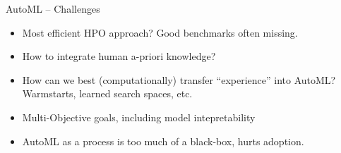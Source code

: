 \begin{frame}{AutoML -- Challenges}
\begin{itemize}
    \item Most efficient HPO approach? Good benchmarks often missing.
    \item How to integrate human a-priori knowledge?
    \item How can we best (computationally) transfer ``experience'' into AutoML?
    Warmstarts, learned search spaces, etc. 
    \item Multi-Objective goals, including model intepretability
    \item AutoML as a process is too much of a black-box, hurts adoption.
\end{itemize}
\end{frame}


\endlecture

